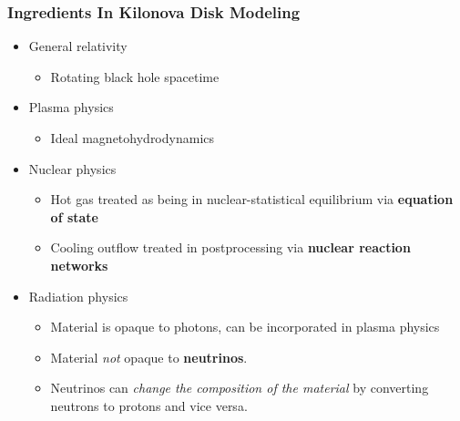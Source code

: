 \documentclass[]{beamer}
\begin{document}
\begin{frame}
  \frametitle{Ingredients In Kilonova Disk Modeling}
  \begin{itemize}
  \item General relativity
    \begin{itemize}
    \item Rotating black hole spacetime
    \end{itemize}
  \item Plasma physics
    \begin{itemize}
    \item Ideal magnetohydrodynamics
    \end{itemize}
  \item Nuclear physics
    \begin{itemize}
    \item Hot gas treated as being in nuclear-statistical equilibrium via \textbf{equation of state}
    \item Cooling outflow treated in postprocessing via \textbf{nuclear reaction networks}
    \end{itemize}
  \item Radiation physics
    \begin{itemize}
    \item Material is opaque to photons, can be incorporated in plasma physics
    \item Material \textit{not} opaque to \textbf{neutrinos}.
    \item Neutrinos can \textit{change the composition of the
        material} by converting neutrons to protons and vice versa.
    \end{itemize}
  \end{itemize}
\end{frame}
\end{document}
